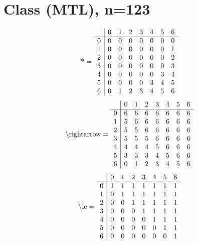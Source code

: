 \documentclass[11pt]{article}
\begin{document}
\section{Class (MTL), n=123}
\[\text{*} = 
\begin{array}{r | r r r r r r r}
 & 0 & 1 & 2 & 3 & 4 & 5 & 6 \\ \hline
0 & 0 & 0 & 0 & 0 & 0 & 0 & 0 \\
1 & 0 & 0 & 0 & 0 & 0 & 0 & 1 \\
2 & 0 & 0 & 0 & 0 & 0 & 0 & 2 \\
3 & 0 & 0 & 0 & 0 & 0 & 0 & 3 \\
4 & 0 & 0 & 0 & 0 & 0 & 3 & 4 \\
5 & 0 & 0 & 0 & 0 & 3 & 4 & 5 \\
6 & 0 & 1 & 2 & 3 & 4 & 5 & 6 \\
\end{array}
\]
\[\text{\textbackslash rightarrow} = 
\begin{array}{r | r r r r r r r}
 & 0 & 1 & 2 & 3 & 4 & 5 & 6 \\ \hline
0 & 6 & 6 & 6 & 6 & 6 & 6 & 6 \\
1 & 5 & 6 & 6 & 6 & 6 & 6 & 6 \\
2 & 5 & 5 & 6 & 6 & 6 & 6 & 6 \\
3 & 5 & 5 & 5 & 6 & 6 & 6 & 6 \\
4 & 4 & 4 & 4 & 5 & 6 & 6 & 6 \\
5 & 3 & 3 & 3 & 4 & 5 & 6 & 6 \\
6 & 0 & 1 & 2 & 3 & 4 & 5 & 6 \\
\end{array}
\]
\[\text{\textbackslash le} = 
\begin{array}{r | r r r r r r r}
 & 0 & 1 & 2 & 3 & 4 & 5 & 6 \\ \hline
0 & 1 & 1 & 1 & 1 & 1 & 1 & 1 \\
1 & 0 & 1 & 1 & 1 & 1 & 1 & 1 \\
2 & 0 & 0 & 1 & 1 & 1 & 1 & 1 \\
3 & 0 & 0 & 0 & 1 & 1 & 1 & 1 \\
4 & 0 & 0 & 0 & 0 & 1 & 1 & 1 \\
5 & 0 & 0 & 0 & 0 & 0 & 1 & 1 \\
6 & 0 & 0 & 0 & 0 & 0 & 0 & 1 \\
\end{array}
\]
\end{document}
